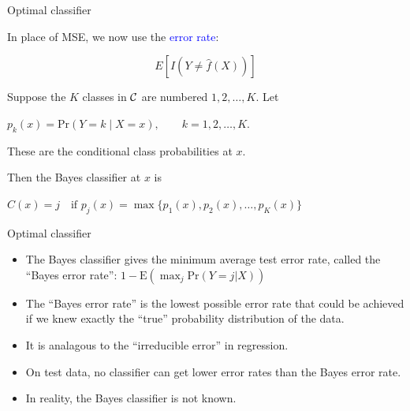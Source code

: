 \documentclass[14pt]{beamer}
\begin{document}
\begin{frame}{Optimal classifier}

In place of MSE, we now use the \textcolor{blue}{error rate}:
\begin{block}{}
$$ E[I(Y \ne \hat{f}(X))] $$
\end{block} \pause
Suppose the $K$ classes in $\cal C$ are
numbered $1, 2, \dots, K$. Let
\begin{block}{}
\centerline{$
p_k(x) = \text{Pr}(Y = k\mid X = x),\qquad k = 1, 2, \dots , K.
$}
\end{block}
These are the \alert{conditional class probabilities} at $x$. \pause


Then the \alert{Bayes classifier} at $x$ is
\begin{block}{}
\centerline{$
C(x) = j\quad \text{if $p_j(x) = \max\{p_1(x), p_2(x), \dots, p_K(x)\}$}
$}
\end{block}

\end{frame}

\begin{frame}{Optimal classifier}
	
	
\begin{itemize}
\item The \alert{Bayes classifier} gives the minimum average test error rate, called the ``Bayes error rate'': $1-\text{E}\left(\max_j \text{Pr}(Y=j | X)\right)$

\item The ``Bayes error rate'' is the lowest possible error rate that could be achieved if we knew exactly the ``true'' probability distribution of the data.
\item It is analagous to the ``irreducible error'' in regression.
\item On test data, no classifier can get lower error rates than the Bayes error rate.
\item In reality, the Bayes classifier is not known.
\end{itemize}

\end{frame}
\end{document}
